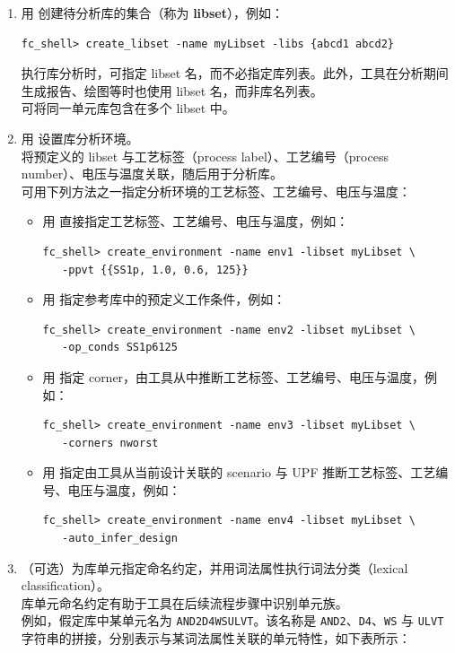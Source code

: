 \begin{enumerate}
  \item 用  创建待分析库的集合（称为 \textbf{libset}），例如：
\begin{lstlisting}
fc_shell> create_libset -name myLibset -libs {abcd1 abcd2}
\end{lstlisting}
    执行库分析时，可指定 libset 名，而不必指定库列表。此外，工具在分析期间生成报告、绘图等时也使用 libset 名，而非库名列表。\\
    可将同一单元库包含在多个 libset 中。

  \item 用  设置库分析环境。\\
     将预定义的 libset 与工艺标签（process label）、工艺编号（process number）、电压与温度关联，随后用于分析库。\\
    可用下列方法之一指定分析环境的工艺标签、工艺编号、电压与温度：
    \begin{itemize}
      \item 用  直接指定工艺标签、工艺编号、电压与温度，例如：
\begin{lstlisting}
fc_shell> create_environment -name env1 -libset myLibset \
   -ppvt {{SS1p, 1.0, 0.6, 125}}
\end{lstlisting}
      \item 用  指定参考库中的预定义工作条件，例如：
\begin{lstlisting}
fc_shell> create_environment -name env2 -libset myLibset \
   -op_conds SS1p6125
\end{lstlisting}
      \item 用  指定 corner，由工具从中推断工艺标签、工艺编号、电压与温度，例如：
\begin{lstlisting}
fc_shell> create_environment -name env3 -libset myLibset \
   -corners nworst
\end{lstlisting}
      \item 用 \opt{-auto\_infer\_design} 指定由工具从当前设计关联的 scenario 与 UPF 推断工艺标签、工艺编号、电压与温度，例如：
\begin{lstlisting}
fc_shell> create_environment -name env4 -libset myLibset \
   -auto_infer_design
\end{lstlisting}
    \end{itemize}

  \item （可选）为库单元指定命名约定，并用词法属性执行词法分类（lexical classification）。\\
    库单元命名约定有助于工具在后续流程步骤中识别单元族。\\
    例如，假定库中某单元名为 \texttt{AND2D4WSULVT}。该名称是 \texttt{AND2}、\texttt{D4}、\texttt{WS} 与 \texttt{ULVT} 字符串的拼接，分别表示与某词法属性关联的单元特性，如下表所示：


\end{enumerate}
